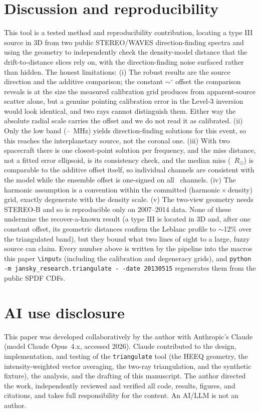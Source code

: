 \documentclass[twocolumn]{aastex631}
\newcommand{\code}[1]{\texttt{#1}}
\begin{document}
\section{Discussion and reproducibility}
This tool is a tested method and reproducibility contribution, locating a type III source in 3D
from two public STEREO/WAVES direction-finding spectra and using the geometry to independently
check the density-model distance that the drift-to-distance slices rely on, with the
direction-finding noise surfaced rather than hidden. The honest limitations: (i) The robust
results are the source direction and the additive comparison; the constant
$\sim$\triBiasDeg$^\circ$ offset the comparison reveals is at the size the measured calibration
grid produces from apparent-source scatter alone, but a genuine pointing calibration error in
the Level-3 inversion would look identical, and two rays cannot distinguish them. Either way
the absolute radial scale carries the offset and we do not read it as calibrated. (ii) Only the
low band (\triFlo--\triFhi~MHz) yields direction-finding solutions for this event, so this
reaches the interplanetary source, not the coronal one. (iii) With two spacecraft there is one
closest-point solution per frequency, and the miss distance, not a fitted error ellipsoid, is
its consistency check, and the median miss (\triMiss~$R_\odot$) is comparable to the additive
offset itself, so individual channels are consistent with the model while the ensemble offset is
one-signed on all \triNtri\ channels. (iv) The harmonic assumption is a convention within the
committed (harmonic\,$\times$\,density) grid, exactly degenerate with the density scale.
(v) The two-view geometry needs STEREO-B and so is reproducible only on 2007--2014 data. None of
these undermine the recover-a-known result (a type III is located in 3D and, after one constant
offset, its geometric distances confirm the Leblanc profile to $\sim$12\% over the triangulated
band), but they bound what two lines of sight to a large, fuzzy source can claim. Every number
above is written by the pipeline into the macros this paper \code{\textbackslash input}s
(including the calibration and degeneracy grids), and
\code{python -m jansky\_research.triangulate -\,-date 20130515} regenerates them from the public
SPDF CDFs.

\section*{AI use disclosure}
This paper was developed collaboratively by the author with Anthropic's Claude
\citep{anthropicclaude} (model Claude Opus~4.x, accessed 2026). Claude contributed to the design,
implementation, and testing of the \code{triangulate} tool (the HEEQ geometry, the intensity-weighted
vector averaging, the two-ray triangulation, and the synthetic fixture), the analysis, and the drafting
of this manuscript. The author directed the work, independently reviewed and verified all code,
results, figures, and citations, and takes full responsibility for the content. An AI/LLM is not an
author.
\end{document}
